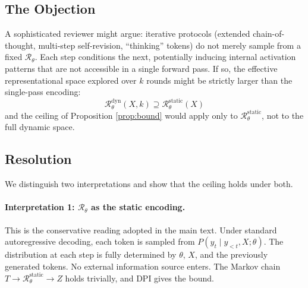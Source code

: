 \documentclass[11pt,a4paper]{article}
\theoremstyle{remark}
\begin{document}
\subsection{The Objection}

A sophisticated reviewer might argue: iterative protocols (extended chain-of-thought, multi-step self-revision, ``thinking'' tokens) do not merely sample from a fixed $\mathcal{R}_\theta$. Each step conditions the next, potentially inducing internal activation patterns that are not accessible in a single forward pass. If so, the effective representational space explored over $k$ rounds might be strictly larger than the single-pass encoding:
\begin{equation}
  \mathcal{R}_\theta^{\mathrm{dyn}}(X, k) \supseteq \mathcal{R}_\theta^{\mathrm{static}}(X)
\end{equation}
and the ceiling of Proposition \ref{prop:bound} would apply only to $\mathcal{R}_\theta^{\mathrm{static}}$, not to the full dynamic space.

\subsection{Resolution}

We distinguish two interpretations and show that the ceiling holds under both.

\paragraph{Interpretation 1: $\mathcal{R}_\theta$ as the static encoding.} This is the conservative reading adopted in the main text. Under standard autoregressive decoding, each token is sampled from $P(y_t \mid y_{<t}, X; \theta)$. The distribution at each step is fully determined by $\theta$, $X$, and the previously generated tokens. No external information source enters. The Markov chain $T \to \mathcal{R}_\theta^{\mathrm{static}} \to Z$ holds trivially, and DPI gives the bound.
\end{document}
